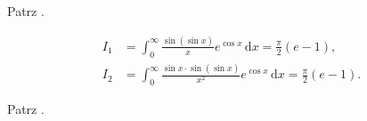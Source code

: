\begin{solution}
    Patrz \cite[s. ?????]{valean19}.
\end{solution}


\begin{problem_with_solution}
    \label{valean_1_41}%
    \begin{align}
        I_1 & = \int_0^\infty \frac{\sin (\sin x)}{x} e^{\cos x} \,\mathrm{d} x = \frac{\pi} 2 (e - 1), \\
        I_2 & = \int_0^\infty \frac{\sin x \cdot \sin (\sin x)}{x^2} e^{\cos x} \,\mathrm{d} x = \frac{\pi} 2 (e - 1).
    \end{align} 
\end{problem_with_solution}

\begin{solution}
    Patrz \cite[s. ?????]{valean19}.
\end{solution}


%